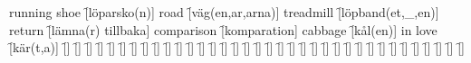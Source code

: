 \begin{questions}
\begin{multicols}{2}
        \question running shoe \f[löparsko(n)]
        \question road \f[väg(en,ar,arna)]
        \question treadmill \f[löpband(et,\_,en)]
        \question return \f[lämna(r) tillbaka]
        \question comparison \f[komparation]
        \question cabbage \f[kål(en)]
        \question in love \f[kär(t,a)]
        \question  \f[]
        \question  \f[]
        \question  \f[]
        \question  \f[]
        \question  \f[]
        \question  \f[]
        \question  \f[]
        \question  \f[]
        \question  \f[]
        \question  \f[]
        \question  \f[]
        \question  \f[]
        \question  \f[]
        \question  \f[]
        \question  \f[]
        \question  \f[]
        \question  \f[]
        \question  \f[]
        \question  \f[]
        \question  \f[]
        \question  \f[]
        \question  \f[]
        \question  \f[]
        \question  \f[]
        \question  \f[]
        \question  \f[]
        \question  \f[]
        \question  \f[]
        \question  \f[]
        \question  \f[]
        \question  \f[]
        \question  \f[]
        \question  \f[]
        \question  \f[]
        \question  \f[]
        \question  \f[]
    \end{multicols}
\end{questions}
